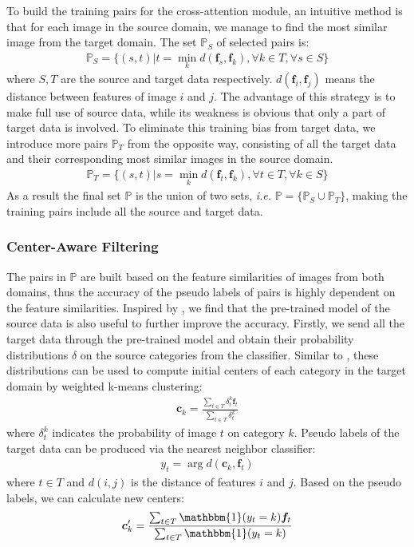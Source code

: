 \documentclass[dvipsnames, svgnames, x11names, table]{article} \usepackage{iclr2022_conference,times}
\def\vc{{\bm{c}}}
\def\vf{{\bm{f}}}
\def\sP{{\mathbb{P}}}
\begin{document}
\begin{spacing}{1.0}
To build the training pairs for the cross-attention module, an intuitive method is that for each image in the source domain, we manage to find the most similar image from the target domain. The set $\sP_S$ of selected pairs is:
\begin{gather}
\sP_S=\{(s,t)|t=\min_k d(\vf_s,\vf_k),\forall k\in T,\forall s\in S\}
\label{eq:ps}
\end{gather}
where $S,T$ are the source and target data respectively. $d(\vf_i,\vf_j)$ means the distance between features of image $i$ and $j$. The advantage of this strategy is to make full use of source data, while its weakness is obvious that only a part of target data is involved. To eliminate this training bias from target data, we introduce more pairs $\sP_T$ from the opposite way, consisting of all the target data and their corresponding most similar 
images in the source domain.
\begin{gather}
\sP_T=\{(s,t)|s=\min_k d(\vf_t,\vf_k),\forall t\in T,\forall k\in S\}
\label{eq:pt}
\end{gather}
As a result the final set $\sP$ is the union of two sets, \textit{i.e.} $\sP=\{\sP_S\cup \sP_T\}$, making the training pairs include all the source and target data.

\subsubsection{Center-Aware Filtering}
The pairs in $\sP$ are built based on the feature similarities of images from both domains, thus the accuracy of the pseudo labels of pairs is highly dependent on the feature similarities. Inspired by \citet{liang2020we}, we find that the pre-trained model of the source data is also useful to further improve the accuracy.
Firstly, we send all the target data through the pre-trained model and obtain their probability distributions $\delta$ on the source categories from the classifier. Similar to \citet{liang2020we}, these distributions can be used to compute initial centers of each category in the target domain by weighted k-means clustering:
\begin{gather}
\vc_k=\frac{\sum_{t\in T}\delta_t^k\vf_t}{\sum_{t\in T}\delta_t^k}
\label{eq:initcenter}
\end{gather}
where $\delta_t^k$ indicates the probability of image $t$ on category $k$. Pseudo labels of the target data can be produced via the nearest neighbor classifier:
\begin{gather}
y_t=\mathop{\arg\min_k}d(\vc_k,\vf_t)
\label{eq:initlabel}
\end{gather}
where $t\in T$ and $d(i,j)$ is the distance of features $i$ and $j$. Based on the pseudo labels, we can calculate new centers:
\begin{gather}
\vc'_k=\frac{\sum_{t\in T}\mathbbm{1}(y_t=k)\vf_t}{\sum_{t\in T}\mathbbm{1}(y_t=k)}
\label{eq:newcenter}
\end{gather}


\end{spacing}
\end{document}
